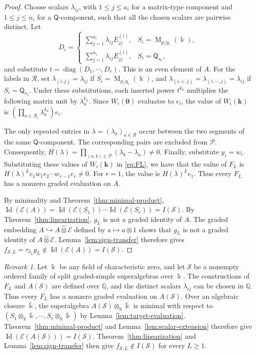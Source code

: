 \documentclass[11pt,reqno]{amsart}
\newcommand{\kk}{\Bbbk}
\newcommand{\E}{\mathcal E}
\newcommand{\Id}{\operatorname{Id}}
\newcommand{\Mat}{\operatorname{M}}
\newcommand{\Qtype}{\mathsf Q}
\theoremstyle{definition}
\theoremstyle{remark}
\newtheorem{remark}[theorem]{Remark}
\numberwithin{equation}{section}
\begin{document}
\begin{proof}
Choose scalars $\lambda_{ij}$, with
$1\leq j\leq a_i$ for a matrix-type component and
$1\leq j\leq n_i$ for a $\Qtype$-component,
such that all the chosen scalars are pairwise distinct.
Let
\[
D_i=
\begin{cases}
\displaystyle\sum_{j=1}^{a_i}\lambda_{ij}E_{jj}^{(i)},
& S_i=\Mat_{p_i|q_i}(\kk),\\[6pt]
\displaystyle\sum_{j=1}^{n_i}\lambda_{ij}E_{jj}^{(i)},
& S_i=\Qtype_{n_i},
\end{cases}
\]
and substitute
$t=\operatorname{diag}(D_1,\cdots,D_r)$.
This is an even element of $A$.
For the labels in $\mathcal R$, set $
\lambda_{(i,j)}=\lambda_{ij} $ if $S_i=\Mat_{p_i|q_i}(\kk)$,
and $
\lambda_{(i,+,j)}=\lambda_{(i,-,j)}=\lambda_{ij}$ if $S_i=\Qtype_{n_i}$.
Under these substitutions, each inserted power $t^{k_a}$
multiplies the following matrix unit by $\lambda_a^{k_a}$.
Since $W_i(\mathbf0)$ evaluates to $e_i$, the value of
$W_i(\mathbf k)$ is $(\prod_{a\in\mathcal R_i}\lambda_a^{k_a}) e_i$.


The only repeated entries in
$\lambda=(\lambda_a)_{a\in\mathcal R}$ occur between
the two segments of the same $\Qtype$-component.
The corresponding pairs are excluded from $\mathcal P$.
Consequently,
$
H(\lambda)=\prod_{(a,b)\in\mathcal P}
(\lambda_b-\lambda_a)\ne0$.
Finally, substitute $y_i=w_i$.
Substituting these values of $W_i(\mathbf k)$ in
\eqref{eq:FL}, 
we have that the value of $F_L$ is $H(\lambda)^L e_1w_1e_2\cdots w_{r-1}e_r\ne0$.
For $r=1$, the value is $H(\lambda)^L e_1$.
Thus every $F_L$ has a nonzero graded evaluation on $A$.

By minimality and Theorem~\ref{thm:minimal-product},
$
\Id(\E(A))
=\Id(\E(S_1))\cdots\Id(\E(S_r))
=I(\mathcal S)$.
By Theorem~\ref{thm:linearization}, $g_L$ is not
a graded identity of $A$.
The graded embedding $
A\hookrightarrow A\mathbin{\widehat{\otimes}}\E$ defined by $ a\longmapsto a\otimes1$
shows that $g_L$ is not a graded identity of
$A\mathbin{\widehat{\otimes}}\E$.
Lemma~\ref{lem:sign-transfer} therefore gives $
f_{\mathcal S,L}=\tau_{\delta_L}g_L
\notin\Id(\E(A))=I(\mathcal S)$.


\end{proof}

\begin{remark}\label{rem:target-evaluation-field}
Let $\kk$ be any field of characteristic zero, and let
$\mathcal S$ be a nonempty ordered family of split graded-simple
superalgebras over $\kk$.
The constructions of $F_L$ and $A(\mathcal S)$ are defined
over $\mathbb Q$, and the distinct scalars $\lambda_{ij}$
can be chosen in $\mathbb Q$.
Thus every $F_L$ has a nonzero graded evaluation on $A(\mathcal S)$.
Over an algebraic closure $\overline\kk$, the superalgebra
$A(\mathcal S)\otimes_\kk\overline\kk$ is minimal with respect to
$(S_1\otimes_\kk\overline\kk,\cdots,S_r\otimes_\kk\overline\kk)$
by Lemma~\ref{lem:target-evaluation}.
Theorem~\ref{thm:minimal-product} and Lemma~\ref{lem:scalar-extension}
therefore give $\Id(\E(A(\mathcal S)))=I(\mathcal S)$.
Theorem~\ref{thm:linearization} and Lemma~\ref{lem:sign-transfer}
then give $f_{\mathcal S,L}\notin I(\mathcal S)$ for every $L\geq1$.
\end{remark}
\end{document}
